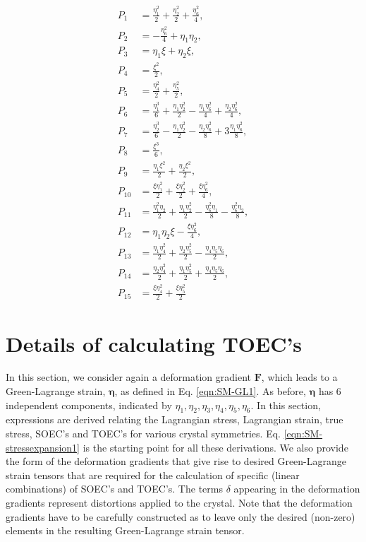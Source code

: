 \documentclass[showpacs,aps,floatfix,prb,reprint,superscriptaddress,onecolumn]{revtex4-1}
\begin{document}
\begin{subequations}
\label{eqn:expansion2detailed} 
\begin{align}
        P_{1} &=\frac{\eta_{1}^2}{2}  + \frac{\eta_{2}^2}{2} + \frac{\eta_{6}^2}{4} ,\\
        P_{2} &=-\frac{\eta_{6}^2}{4} + \eta_{1}\eta_{2} ,\\
				P_{3} &=\eta_{1}\xi + \eta_{2}\xi , \\
				P_{4} &=\frac{\xi^2}{2} , \\
				P_{5} &=\frac{\eta_{4}^2}{2} + \frac{\eta_{5}^2}{2} , \\
				P_{6} &=\frac{\eta_{1}^3}{6} + \frac{\eta_{1}\eta_{2}^2}{2} - \frac{\eta_{1}\eta_{6}^2}{4} + \frac{\eta_{2}\eta_{6}^2}{4} , \\
				P_{7} &=\frac{\eta_{2}^3}{6} - \frac{\eta_{1}\eta_{2}^2}{2} - \frac{\eta_{2}\eta_{6}^2}{8} + 3\frac{\eta_{1}\eta_{6}^2}{8} , \\
				P_{8} &=\frac{\xi^3}{6} , \\
				P_{9} &=\frac{\eta_{1}\xi^2}{2} + \frac{\eta_{2}\xi^2}{2} , \\
				P_{10} &=\frac{\xi \eta_{1}^2}{2} + \frac{\xi \eta_{2}^2}{2} + \frac{\xi \eta_{6}^2}{4} , \\
				P_{11} &=\frac{\eta_{1}^2\eta_{2}}{2} +  \frac{\eta_{1}\eta_{2}^2}{2} - \frac{\eta_{6}^2\eta_{1}}{8} - \frac{\eta_{6}^2\eta_{2}}{8} , \\
				P_{12} &=\eta_{1}\eta_{2}\xi - \frac{\xi\eta_{6}^2}{4} , \\
				P_{13} &=\frac{\eta_{1}\eta_{4}^2}{2} + \frac{\eta_{2}\eta_{5}^2}{2} - \frac{\eta_{4}\eta_{5}\eta_{6}}{2} , \\
				P_{14} &=\frac{\eta_{2}\eta_{4}^2}{2} + \frac{\eta_{1}\eta_{5}^2}{2} + \frac{\eta_{4}\eta_{5}\eta_{6}}{2} , \\
				P_{15} &=\frac{\xi \eta_{4}^2}{2} + \frac{\xi \eta_{5}^2}{2} 
\end{align}
\end{subequations}

\section{Details of calculating TOEC's}
In this section, we consider again a deformation gradient $\mathbf{F}$, which leads to a Green-Lagrange strain, $\mathbf{\mathbf{\eta}}$, as defined in Eq. \ref{eqn:SM-GL1}. As before, $\mathbf{\bm{\eta}}$ has 6 independent components, indicated by $\eta_{1}, \eta_{2}, \eta_{3}, \eta_{4}, \eta_{5}, \eta_{6}$. In this section, expressions are derived relating the Lagrangian stress, Lagrangian strain, true stress, SOEC's and TOEC's for various crystal symmetries. Eq. \ref{eqn:SM-stressexpansion1} is the starting point for all these derivations. We also provide the form of the deformation gradients that give rise to desired Green-Lagrange strain tensors that are required for the calculation of specific (linear combinations) of SOEC's and TOEC's. The terms $\delta$ appearing in the deformation gradients represent distortions applied to the crystal. Note that the deformation gradients have to be carefully constructed as to leave only the desired (non-zero) elements in the resulting Green-Lagrange strain tensor.
\end{document}
